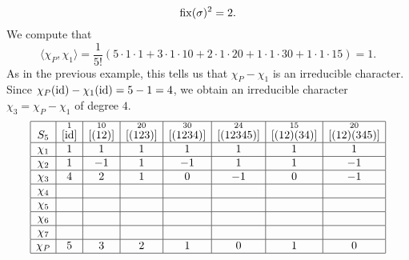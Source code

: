 \begin{exmp}{}
\[    \operatorname{fix}(\sigma)^2 = 2. \] 
    We compute that 
    \[ \langle \chi_P, \chi_1 \rangle = \frac1{5!} 
    (5 \cdot 1 \cdot 1 + 3 \cdot 1 \cdot 10 + 2 \cdot 1 \cdot 20 + 1 \cdot 1 \cdot 30
    + 1 \cdot 1 \cdot 15) = 1. \] 
    As in the previous example, this tells us that $\chi_P - \chi_1$ is an 
    irreducible character. Since $\chi_P(\operatorname{id}) - \chi_1(\operatorname{id}) = 5 - 1 = 4$, 
    we obtain an irreducible character $\chi_3 = \chi_P - \chi_1$ of degree $4$.
    \begin{align*}
        \begin{array}{|c|c|c|c|c|c|c|c|}
            \hline
            S_5    & \overset{1}{[\operatorname{id}]} & \overset{10}{[(12)]} & \overset{20}{[(123)]} & \overset{30}{[(1234)]} & \overset{24}{[(12345)]} & \overset{15}{[(12)(34)]} & \overset{20}{[(12)(345)]} \\ \hline
            \chi_1 & 1                  & 1                    & 1                     & 1                      & 1                       & 1                        & 1                         \\ \hline
            \chi_2 & 1                  & -1                   & 1                     & -1                     & 1                       & 1                        & -1                        \\ \hline
            \chi_3 & 4                  & 2                    & 1                     & 0                      & -1                      & 0                        & -1                        \\ \hline
            \chi_4 &                    &                      &                       &                        &                         &                          &                           \\ \hline
            \chi_5 &                    &                      &                       &                        &                         &                          &                           \\ \hline
            \chi_6 &                    &                      &                       &                        &                         &                          &                           \\ \hline
            \chi_7 &                    &                      &                       &                        &                         &                          &                           \\ \hline
            \chi_P & 5                  & 3                    & 2                     & 1                      & 0                       & 1                        & 0                         \\ \hline 

\end{array}
\end{align*}
\end{exmp}
